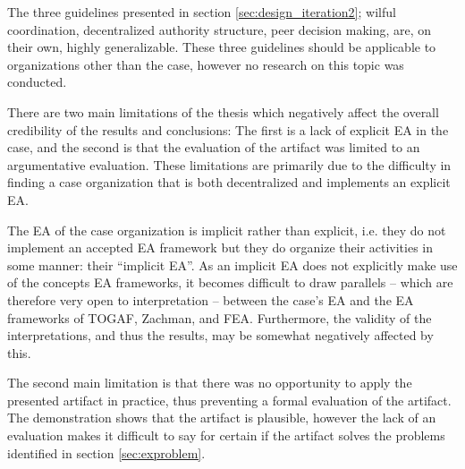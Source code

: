 %
%
%
%
%
%
The three guidelines presented in section \ref{sec:design_iteration2}; wilful coordination, decentralized authority structure, peer decision making, are, on their own, highly generalizable. These three guidelines should be applicable to organizations other than the case, however no research on this topic was conducted.

There are two main limitations of the thesis which negatively affect the overall credibility of the results and conclusions: The first is a lack of explicit EA in the case, and the second is that the evaluation of the artifact was limited to an argumentative evaluation. These limitations are primarily due to the difficulty in finding a case organization that is both decentralized and implements an explicit EA. 

The EA of the case organization is implicit rather than explicit, i.e. they do not implement an accepted EA framework but they do organize their activities in some manner: their ``implicit EA''. As an implicit EA does not explicitly make use of the concepts EA frameworks, it becomes difficult to draw parallels -- which are therefore very open to interpretation -- between the case's EA and the EA frameworks of TOGAF, Zachman, and FEA.  Furthermore, the validity of the interpretations, and thus the results, may be somewhat negatively affected by this.

The second main limitation is that there was no opportunity to apply the presented artifact in practice, thus preventing a formal evaluation of the artifact. The demonstration shows that the artifact is plausible, however the lack of an evaluation makes it difficult to say for certain if the artifact solves the problems identified in section \ref{sec:exproblem}.


  